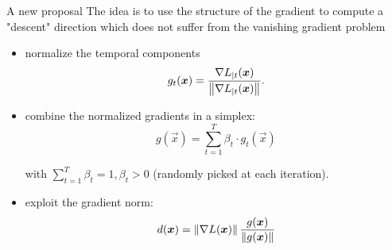 \begin{frame}{A new proposal}
	The idea is to use the structure of the gradient to compute a "descent" direction which does not suffer from the vanishing gradient problem
\begin{itemize}
	\item normalize the temporal components
	\begin{equation}
	g_t(\boldsymbol{x}) = \frac{\nabla L_{|t}(\boldsymbol{x})}{\left\Vert \nabla L_{|t}(\boldsymbol{x}) \right\Vert}.
	\end{equation}
	
	\item combine the normalized gradients in a simplex:
		\begin{equation}
		g(\vec{x}) = \sum_{t=1}^T \beta_t \cdot g_t(\vec{x})
		\end{equation}
		
		with $\sum_{t=1}^T\beta_t=1, \beta_t>0$ (randomly picked at each iteration).
	\item exploit the gradient norm:
	\begin{equation}
			d(\boldsymbol{x}) = \left\Vert \nabla L (\boldsymbol{x}) \right\Vert\frac{g(\boldsymbol{x})}{\left\Vert g(\boldsymbol{x}) \right\Vert}
	\end{equation}
\end{itemize}



\end{frame}
